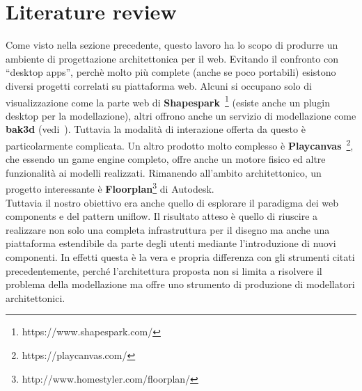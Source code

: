 \section{Literature review}\label{sec:literature}

Come visto nella sezione precedente, questo lavoro ha lo scopo di produrre un ambiente di progettazione architettonica per il web. Evitando il confronto con ``desktop apps'', perch\`e molto pi\`u complete (anche se poco portabili) esistono diversi progetti correlati su piattaforma web. Alcuni si occupano solo di visualizzazione come la parte web di \textbf{Shapespark}~\footnote{https://www.shapespark.com/} (esiste anche un plugin desktop per la modellazione), altri offrono anche un servizio di modellazione come \textbf{bak3d} (vedi~\cite{Spini:2016:WIA:2945292.2945309}). Tuttavia la modalit\`a di interazione offerta da questo \`e particolarmente complicata. Un altro prodotto molto complesso \`e \textbf{Playcanvas}~\footnote{https://playcanvas.com/}, che essendo un game engine completo, offre anche un motore fisico ed altre funzionalit\`a ai modelli realizzati. Rimanendo all'ambito architettonico, un progetto interessante \`e \textbf{Floorplan}\footnote{http://www.homestyler.com/floorplan/} di Autodesk.\\
Tuttavia il nostro obiettivo era anche quello di esplorare il paradigma dei web components e del pattern uniflow. Il risultato atteso \`e quello di riuscire a realizzare non solo una completa infrastruttura per il disegno ma anche una piattaforma estendibile da parte degli utenti mediante l'introduzione di nuovi componenti. In effetti questa \`e la vera e propria differenza con gli strumenti citati precedentemente, perché l'architettura proposta non si limita a risolvere il problema della modellazione ma offre uno strumento di produzione di modellatori architettonici.